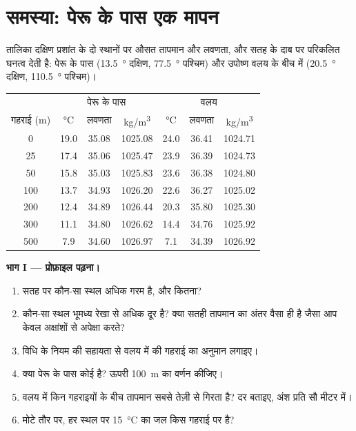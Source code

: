 \section{समस्या: पेरू के पास एक मापन}

\begin{problem}[{सप्ताहांत समस्या --- दक्षिण प्रशांत के दो प्रोफ़ाइल}]
\label{pb:g10:layered-ocean:1}
तालिका दक्षिण प्रशांत के दो स्थानों पर औसत तापमान और लवणता, और
सतह के दाब पर परिकलित घनत्व देती है:
पेरू के पास (\qty{13.5}{\degree} दक्षिण, \qty{77.5}{\degree} पश्चिम) और
उपोष्ण वलय के बीच में (\qty{20.5}{\degree} दक्षिण, \qty{110.5}{\degree} पश्चिम)।

\begin{center}
\small
\begin{tabular}{c|ccc|ccc}
\hline
 & \multicolumn{3}{c|}{पेरू के पास} & \multicolumn{3}{c}{वलय} \\
गहराई (\unit{m}) & \unit{\degreeCelsius} & लवणता & \unit{kg/m^3} & \unit{\degreeCelsius} & लवणता & \unit{kg/m^3} \\
\hline
0 & 19.0 & 35.08 & 1025.08 & 24.0 & 36.41 & 1024.71 \\
25 & 17.4 & 35.06 & 1025.47 & 23.9 & 36.39 & 1024.73 \\
50 & 15.8 & 35.03 & 1025.83 & 23.6 & 36.38 & 1024.80 \\
100 & 13.7 & 34.93 & 1026.20 & 22.6 & 36.27 & 1025.02 \\
200 & 12.4 & 34.89 & 1026.44 & 20.3 & 35.80 & 1025.30 \\
300 & 11.1 & 34.80 & 1026.62 & 14.4 & 34.76 & 1025.92 \\
500 & 7.9 & 34.60 & 1026.97 & 7.1 & 34.39 & 1026.92 \\
\hline
\end{tabular}
\end{center}

\medskip
\noindent\textbf{भाग I --- प्रोफ़ाइल पढ़ना।}
\begin{enumerate}
  \item सतह पर कौन-सा स्थल अधिक गरम है, और कितना?
  \item कौन-सा स्थल भूमध्य रेखा से अधिक दूर है? क्या सतही तापमान का अंतर
        वैसा ही है जैसा आप केवल अक्षांशों से अपेक्षा करते?
  \item विधि के नियम की सहायता से वलय में  की गहराई का
        अनुमान लगाइए।
  \item क्या पेरू के पास कोई  है? ऊपरी \qty{100}{m} का वर्णन कीजिए।
  \item वलय में किन गहराइयों के बीच तापमान सबसे तेज़ी से गिरता है?
        दर बताइए, अंश प्रति सौ मीटर में।
  \item मोटे तौर पर, हर स्थल पर \qty{15}{\degreeCelsius} का जल किस गहराई पर
        है?
\end{enumerate}


\end{problem}
